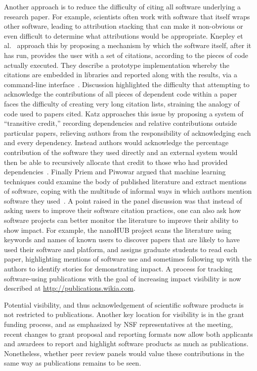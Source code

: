 \documentclass[11pt, oneside]{amsart}
\begin{document}
Another approach is to reduce the difficulty of citing all software
underlying a research paper. For example, scientists often work with
software that itself wraps other software, leading to attribution
stacking that can make it non-obvious or even difficult to determine
what attributions would be appropriate. Knepley et
al.~\cite{Knepley_WSSSPE} approach this by proposing a mechanism by
which the software itself, after it has run, provides the user with a
set of citations, according to the pieces of code actually
executed. They describe a prototype implementation whereby the
citations are embedded in libraries and reported along with the
results, via a command-line
interface~\cite{Knepley_WSSSPE}. Discussion highlighted the difficulty
that attempting to acknowledge the contributions of all pieces of
dependent code within a paper faces the difficulty of creating very
long citation lists, straining the analogy of code used to papers
cited. Katz approaches this issue by proposing a system of
``transitive credit,'' recording dependencies and relative
contributions outside particular papers, relieving authors from the
responsibility of acknowledging each and every dependency. Instead
authors would acknowledge the percentage contribution of the software
they used directly and an external system would then be able to
recursively allocate that credit to those who had provided
dependencies~\cite{Katz2_WSSSPE}. Finally Priem and Piwowar argued that machine learning
techniques could examine the body of published literature and extract
mentions of software, coping with the multitude of informal ways in
which authors mention software they used~\cite{Priem_WSSSPE}.  A point
raised in the panel discussion was that instead of asking users to
improve their software citation practices, one can also ask how
software projects can better monitor the literature to improve their
ability to show impact. For example, the nanoHUB project scans the
literature using keywords and names of known users to discover papers
that are likely to have used their software and platform, and assigns
graduate students to read each paper, highlighting mentions of
software use and sometimes following up with the authors to identify
stories for demonstrating impact.  A process for tracking
software-using publications with the goal of increasing impact
visibility is now described at \url{http://publications.wikia.com}.

Potential visibility, and thus acknowledgement of scientific software
products is not restricted to publications. Another key location for
visibility is in the grant funding process, and as emphasized by NSF
representatives at the meeting, recent changes to grant proposal and
reporting formats now allow both applicants and awardees to report and
highlight software products as much as publications. Nonetheless,
whether peer review panels would value these contributions in the same
way as publications remains to be seen.
\end{document}
